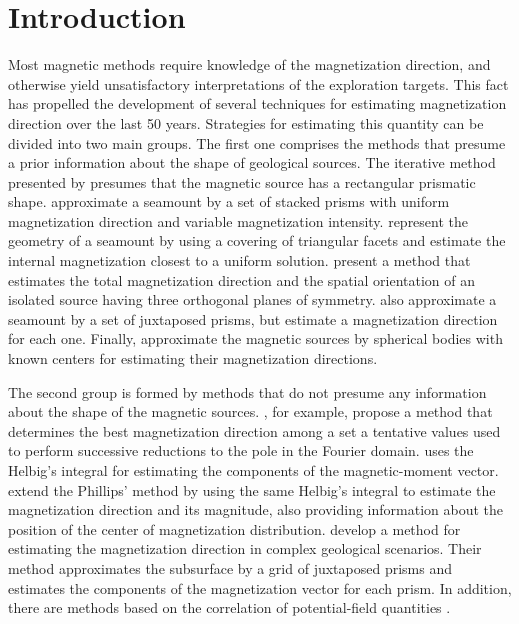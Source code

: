 \section{Introduction}

Most  magnetic methods require knowledge of the magnetization direction, and otherwise 
yield unsatisfactory interpretations of the exploration targets. This fact has 
propelled the development of several techniques for estimating magnetization 
direction over the last 50 years. Strategies for estimating this quantity can be 
divided into two main groups. The first one comprises the methods that presume a prior 
information about the shape of geological sources. The iterative method presented by 
\cite{bhattacharyya1966} presumes that the magnetic source has a rectangular prismatic shape. 
\cite{emilia_massey_1974} approximate a seamount by a set of stacked 
prisms with uniform magnetization direction and variable magnetization intensity. 
\cite{parker_etal_1987} represent the geometry of a seamount by using a 
covering of triangular facets and estimate the internal magnetization closest to 
a uniform solution.
\cite{medeiros_silva_1995} present a method that estimates the total magnetization 
direction and the spatial orientation of an isolated source having three orthogonal planes of 
symmetry. 
\cite{kubota2005} also approximate a seamount by a set of juxtaposed prisms, but estimate a 
magnetization direction for each one. 
Finally, \cite{oliveirajr_etal_2015} approximate the magnetic sources by spherical bodies with 
known centers for estimating their magnetization directions. 

The second group is formed by methods that do not presume any information about the shape of the 
magnetic sources. \cite{fedi_etal_1994}, for example, propose a method that determines the best 
magnetization direction among a set a tentative values used to perform 
successive reductions to the pole in the Fourier domain. 
\cite{phillips2005} uses the Helbig's integral for estimating the components of the magnetic-moment vector. 
\cite{tontini_pedersen_2008} extend the Phillips' method by using the same Helbig's integral 
to estimate the magnetization direction and its magnitude, also providing information about the position 
of the center of magnetization distribution. \cite{lelievre_oldenburg_2009} develop a method for estimating 
the magnetization direction in complex geological scenarios. Their method approximates the subsurface 
by a grid of juxtaposed prisms and estimates the components of the magnetization vector for each prism.
In addition, there are methods based on the correlation of potential-field quantities \citep[e.g.,][]{dannemiller_li_2006,gerovska_etal_2009,liu_etal_2015,zhang_etal_2018,
ribeiro_filho_etal2020}.

